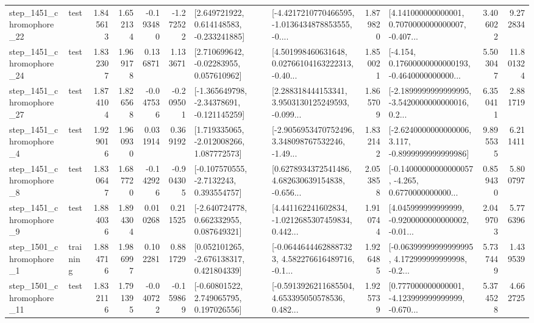 \begin{tabular}{llrrrrllrlrr}
 step\_1451\_chromophore\_22 &      test &      1.845613 &    1.652134 &     -0.193480 & -1.272522 &    [2.649721922, 0.614148583, -0.233241885] &  [-4.4217210770466595, -1.0136434878853555, -0.... &       1.879820 &  [4.141000000000001, 0.7070000000000007, -0.407... &            3.406022 &          9.272834 \\
 step\_1451\_chromophore\_24 &      test &      1.832307 &    1.969178 &      0.136871 &  1.133671 &     [2.710699642, -0.02283955, 0.057610962] &  [4.501998460631648, 0.02766104163222313, -0.40... &       1.850021 &  [-4.154, 0.17600000000000193, -0.4640000000000... &            5.503047 &         11.801324 \\
 step\_1451\_chromophore\_27 &      test &      1.874104 &    1.826568 &     -0.047536 & -0.209501 &   [-1.365649798, -2.34378691, -0.121145259] &  [2.288318444153341, 3.9503130125249593, -0.099... &       1.865709 &  [-2.1899999999999995, -3.5420000000000016, 0.2... &            6.350411 &          2.881719 \\
  step\_1451\_chromophore\_4 &      test &      1.929016 &    1.960930 &      0.031914 &  0.369192 &    [1.719335065, -2.012008266, 1.087772573] &  [-2.9056953470752496, 3.348098767532246, -1.49... &       1.832142 &  [-2.6240000000000006, 3.117, -0.8999999999999986] &            9.895535 &          6.211411 \\
  step\_1451\_chromophore\_8 &      test &      1.830647 &    1.687720 &     -0.142926 & -0.904305 &     [-0.107570555, -2.7132243, 0.393554757] &  [0.6278934372541486, 4.682630639154838, -0.656... &       2.053858 &  [-0.14000000000000057, -4.265, 0.6770000000000... &            0.859430 &          5.800797 \\
  step\_1451\_chromophore\_9 &      test &      1.884036 &    1.894304 &      0.010268 &  0.211525 &    [-2.640724778, 0.662332955, 0.087649321] &  [4.441162241602834, -1.0212685307459834, 0.442... &       1.910744 &  [4.045999999999999, -0.9200000000000002, -0.01... &            2.049703 &          5.776396 \\
  step\_1501\_chromophore\_1 &  training &      1.884716 &    1.986997 &      0.102281 &  0.881729 &    [0.052101265, -2.676138317, 0.421804339] &  [-0.06446444628887323, 4.582276616489716, -0.1... &       1.926485 &  [-0.06399999999999995, 4.172999999999998, -0.2... &            5.737449 &          1.439539 \\
 step\_1501\_chromophore\_11 &      test &      1.832116 &    1.791395 &     -0.040722 & -0.159869 &     [-0.60801522, 2.749065795, 0.197026556] &  [-0.5913926211685504, 4.653395050578536, 0.482... &       1.925739 &  [0.777000000000001, -4.123999999999999, -0.670... &            5.374528 &          4.662725 \\

\end{tabular}
